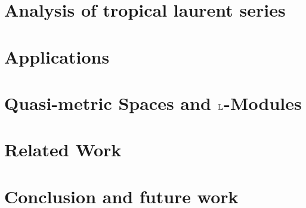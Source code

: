 \documentclass[conference]{IEEEtran}
\begin{document}
\section{Analysis of tropical laurent series}
%


\section{Applications}
%


\section{Quasi-metric Spaces and $\mathbb{L}$-Modules}\label{sec:QMod}
%


\section{Related Work}



\section{Conclusion and future work}

\end{document}
